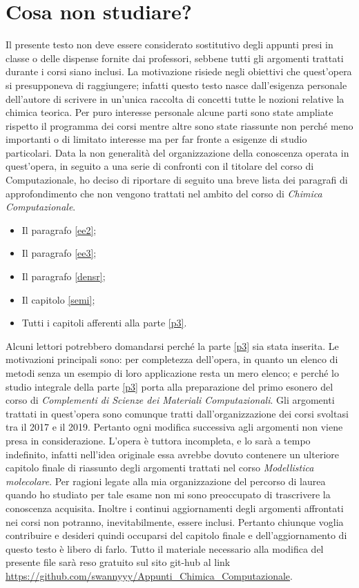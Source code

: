 \documentclass[oneside]{amsbook}
\numberwithin{section}{chapter}
\numberwithin{equation}{section}
\numberwithin{figure}{section}
\begin{document}
\chapter*{Cosa non studiare?}
Il presente testo non deve essere considerato sostitutivo degli appunti presi in classe o delle dispense fornite dai professori, sebbene tutti gli argomenti trattati durante i corsi siano inclusi. La motivazione risiede negli obiettivi che quest'opera si presupponeva di raggiungere; infatti questo testo nasce dall'esigenza personale dell'autore di scrivere in un'unica raccolta di concetti tutte le nozioni relative la chimica teorica. Per puro interesse personale alcune parti sono state ampliate rispetto il programma dei corsi mentre altre sono state riassunte non perché meno importanti o di limitato interesse ma per far fronte a esigenze di studio particolari. Data la non generalità del organizzazione della conoscenza operata in quest'opera, in seguito a una serie di confronti con il titolare del corso di Computazionale, ho deciso di riportare di seguito una breve lista dei paragrafi di approfondimento che non vengono trattati nel ambito del corso di \emph{Chimica Computazionale}.
\begin{itemize}
\item Il paragrafo \ref{ee2};
\item Il paragrafo \ref{ee3};
\item Il paragrafo \ref{densr};
\item Il capitolo \ref{semi};
\item Tutti i capitoli afferenti alla parte \ref{p3}.
\end{itemize}
Alcuni lettori potrebbero domandarsi perché la parte \ref{p3} sia stata inserita. Le motivazioni principali sono: per completezza dell'opera, in quanto un elenco di metodi senza un esempio di loro applicazione resta un mero elenco; e perché lo studio integrale della parte \ref{p3} porta alla preparazione del primo esonero del corso di \emph{Complementi di Scienze dei Materiali Computazionali}.
Gli argomenti trattati in quest'opera sono comunque tratti dall'organizzazione dei corsi svoltasi tra il 2017 e il 2019. Pertanto ogni modifica successiva agli argomenti non viene presa in considerazione.
L'opera è tuttora incompleta, e lo sarà a tempo indefinito, infatti nell'idea originale essa avrebbe dovuto contenere un ulteriore capitolo finale di riassunto degli argomenti trattati nel corso \emph{Modellistica molecolare}. Per ragioni legate alla mia organizzazione del percorso di laurea quando ho studiato per tale esame non mi sono preoccupato di trascrivere la conoscenza acquisita. Inoltre i continui aggiornamenti degli argomenti affrontati nei corsi non potranno, inevitabilmente, essere inclusi.  Pertanto chiunque voglia contribuire e desideri quindi occuparsi del capitolo finale e dell'aggiornamento di questo testo è libero di farlo. Tutto il materiale necessario alla modifica del presente file sarà reso gratuito sul sito git-hub al link \url{https://github.com/swannyyy/Appunti_Chimica_Computazionale}.
\end{document}
